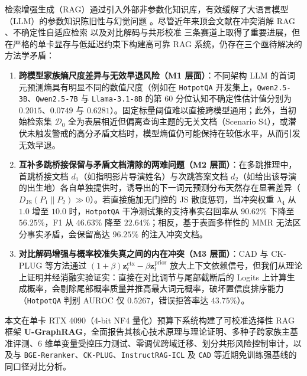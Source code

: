 \documentclass[11pt]{article}
\begin{document}
检索增强生成（RAG）通过引入外部非参数化知识库，有效缓解了大语言模型（LLM）的参数知识陈旧性与幻觉问题 \cite{yang2018hotpotqa,mallen2023popqa}。尽管近年来顶会文献在冲突消解 RAG \cite{wei2025instructrag,xiang2024robustrag,wang2025madamrag,bi2026ckplug}、不确定性自适应检索 \cite{su2024dragin,jeong2024adaptiverag,yao2025seakr,adarague2025} 以及对比解码与共形校准 \cite{shi2024cad,gema2025decore,sinha2025crg} 三条赛道上取得了重要进展，但在严格的单卡显存与低延迟约束下构建高可靠 RAG 系统，仍存在三个亟待解决的方法学矛盾：

\begin{enumerate}[leftmargin=*,nosep]
    \item \textbf{跨模型家族熵尺度差异与无效早退风险（M1 层面）}：不同架构 LLM 的首词元预测熵具有明显不同的数值尺度（例如在 \texttt{HotpotQA} 开发集上，\texttt{Qwen2.5-3B}、\texttt{Qwen2.5-7B} 与 \texttt{Llama-3.1-8B} 的第 60 分位认知不确定性估计值分别为 $0.2015$、$0.0749$ 与 $0.6281$）。固定标量阈值难以直接跨模型通用；此外，当初始检索集 $\mathcal{D}_0$ 全为表层相近但偏离查询主题的无关文档（Scenario S4），或潜伏未触发警戒的高分矛盾文档时，模型熵值仍可能保持在较低水平，从而引发无效早退。
    \item \textbf{互补多跳桥接保留与矛盾文档清除的两难问题（M2 层面）}：在多跳推理中，首跳桥接文档 $d_1$（如指明影片导演姓名）与次跳答案文档 $d_2$（如给出该导演的出生地）各自单独提供时，诱导出的下一词元预测分布天然存在显著差异（$D_{\text{JS}}(P_1 \parallel P_2) \gg 0$）。若直接施加无门控的 JS 散度惩罚，当冲突权重 $\lambda_4$ 从 $1.0$ 增至 $10.0$ 时，\texttt{HotpotQA} 干净测试集的支持事实召回率从 $90.62\%$ 下降至 $56.25\%$，F1 从 $46.63\%$ 降至 $22.64\%$；相反，基于表面多样性的 MMR \cite{carbonell1998mmr} 无法区分事实矛盾，会保留高达 $96.25\%$ 的注入冲突文档。
    \item \textbf{对比解码增强与概率校准失真之间的内在冲突（M3 层面）}：CAD \cite{shi2024cad} 与 CK-PLUG \cite{bi2026ckplug} 等方法通过 $(1+\beta)\mathbf{z}_t^{\text{ctx}} - \beta\mathbf{z}_t^{\text{prior}}$ 放大上下文依赖信号，但我们从理论上证明并经消融实验证实：直接在对比调节与尾部截断后的 Logits 上计算生成概率，会剔除尾部概率质量并推高最大词元概率，破坏置信度排序能力（\texttt{HotpotQA} 判别 AUROC 仅 $0.5267$，错误拒答率达 $43.75\%$）。
\end{enumerate}

本文在单卡 RTX 4090（4-bit NF4 量化）预算下系统构建了可校准选择性 RAG 框架 \textbf{U-GraphRAG}，全面报告其核心技术原理与理论证明、多种子跨家族主基准评测、6 维单变量受控压力测试、零调优跨域迁移、划分共形风险控制审计，以及与 \texttt{BGE-Reranker}、\texttt{CK-PLUG}、\texttt{InstructRAG-ICL} 及 \texttt{CAD} 等近期免训练强基线的同口径对比分析。
\end{document}
